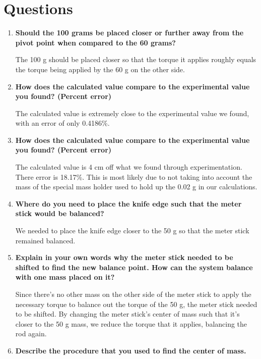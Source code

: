 
 \section{Questions}

\vspace{-0.5cm}
\singlespacing

\begin{enumerate}
	\item \textbf{Should the 100 grams be placed closer or further away from the pivot point when compared to the 60 grams?}

	The 100 g should be placed closer so that the torque it applies roughly equals the torque being applied by the 60 g on the other side. 	

	\item \textbf{How does the calculated value compare to the experimental value you found? (Percent error)}

		The calculated value is extremely close to the experimental value we found, with an error of only 0.4186\%.

\item \textbf{How does the calculated value compare to the experimental value you found? (Percent error)}

The calculated value is 4 cm off what we found through experimentation. There error is 18.17\%. This is most likely due to not taking into account the mass of the special mass holder used to hold up the 0.02 g in our calculations.

\item \textbf{Where do you need to place the knife edge such that the meter stick would be balanced?}

	We needed to place the knife edge closer to the 50 g so that the meter stick remained balanced.

\item \textbf{Explain in your own words why the meter stick needed to be shifted to find the new balance point. How can the system balance with one mass placed on it?}

Since there's no other mass on the other side of the meter stick to apply the necessary torque to balance out the torque of the 50 g, the meter stick needed to be shifted. By changing the meter stick's center of mass such that it's closer to the 50 g mass, we reduce the torque that it applies, balancing the rod again.

\item \textbf{Describe the procedure that you used to find the center of mass.}


\end{enumerate}
